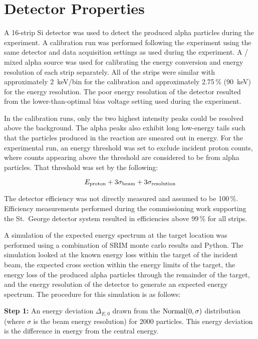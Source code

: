 \section{Detector Properties}
\label{sec:detector-properties}

A 16-strip Si detector was used to detect the produced alpha particles during
the experiment. A calibration run was performed following the experiment using
the same detector and data acquisition settings as used during the experiment.
A / mixed alpha source was used for calibrating the
energy conversion and energy resolution of each strip separately. All of the
strips were similar with approximately 2~keV/bin for the calibration and
approximately 2.75\,\% (90~keV) for the energy resolution. The poor
energy resolution of the detector resulted from the lower-than-optimal
bias voltage setting used during the experiment.

In the calibration runs, only the two highest intensity peaks could be resolved
above the background. The alpha peaks also exhibit long
low-energy tails such that the particles produced in the \alpa{} reaction are
smeared out in energy. For the experimental run, an energy threshold was
set to exclude incident proton counts, where counts appearing above the
threshold are considered to be from alpha particles. That threshold was
set by the following:

\begin{equation}
    E_{\rm proton} + 3 \sigma_{\rm beam} + 3 \sigma_{\rm resolution}
\end{equation}

The detector efficiency was not directly measured and assumed to be
100\,\%. Efficiency measurements performed during the commissioning work
supporting the St.\ George detector system resulted in efficiencies above
99\,\% for all strips.

A simulation of the expected energy spectrum at the target location was
performed using a combination of SRIM monte carlo results and Python. The
simulation looked at the known energy loss within the target of the incident
beam, the expected cross
section within the energy limits of the target, the energy loss of the
produced alpha particles through the remainder of the target, and the
energy resolution of the detector to generate an expected energy
spectrum. The procedure for this simulation is as follows:


\textbf{Step 1:}
  An energy deviation $\Delta_{E,0}$ drawn from the $\rm{Normal}(0,\sigma)$
  distribution (where $\sigma$ is the beam energy resolution) for 2000
  particles. This energy deviation is the difference in energy from the central
  energy.

